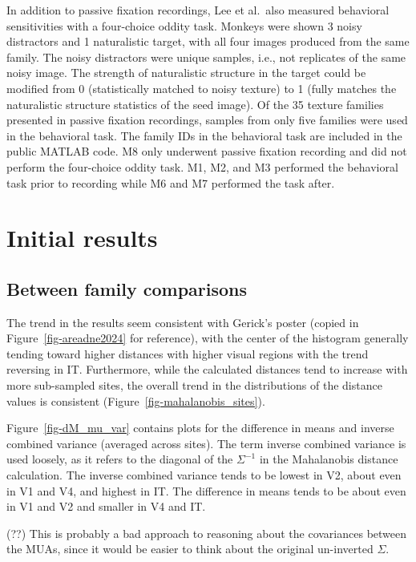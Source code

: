 \documentclass[
  11pt,
  letterpaper,
  DIV=11,
  numbers=noendperiod]{scrartcl}
\begin{document}
In addition to passive fixation recordings, Lee et al.~also measured
behavioral sensitivities with a four-choice oddity task. Monkeys were
shown 3 noisy distractors and 1 naturalistic target, with all four
images produced from the same family. The noisy distractors were unique
samples, i.e., not replicates of the same noisy image. The strength of
naturalistic structure in the target could be modified from 0
(statistically matched to noisy texture) to 1 (fully matches the
naturalistic structure statistics of the seed image). Of the 35 texture
families presented in passive fixation recordings, samples from only
five families were used in the behavioral task. The family IDs in the
behavioral task are included in the public MATLAB code. M8 only
underwent passive fixation recording and did not perform the four-choice
oddity task. M1, M2, and M3 performed the behavioral task prior to
recording while M6 and M7 performed the task after.

\section{Initial results}\label{initial-results}

\subsection{Between family
comparisons}\label{between-family-comparisons}

The trend in the results seem consistent with Gerick's poster (copied in
Figure~\ref{fig-areadne2024} for reference), with the center of the
histogram generally tending toward higher distances with higher visual
regions with the trend reversing in IT. Furthermore, while the
calculated distances tend to increase with more sub-sampled sites, the
overall trend in the distributions of the distance values is consistent
(Figure~\ref{fig-mahalanobis_sites}).

Figure~\ref{fig-dM_mu_var} contains plots for the difference in means
and inverse combined variance (averaged across sites). The term inverse
combined variance is used loosely, as it refers to the diagonal of the
\(\Sigma^{-1}\) in the Mahalanobis distance calculation. The inverse
combined variance tends to be lowest in V2, about even in V1 and V4, and
highest in IT. The difference in means tends to be about even in V1 and
V2 and smaller in V4 and IT.

(??) This is probably a bad approach to reasoning about the covariances
between the MUAs, since it would be easier to think about the original
un-inverted \(\Sigma\).
\end{document}
